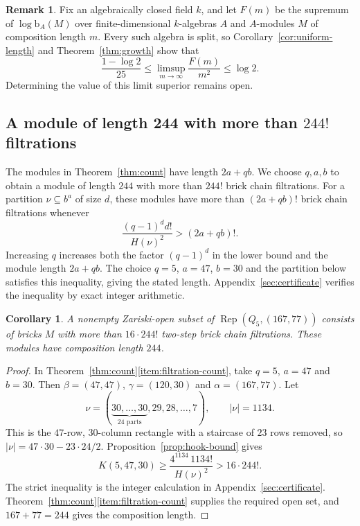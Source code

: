 \documentclass[a4paper,reqno,10pt]{amsart}
\newtheorem{corollary}[theorem]{Corollary}
\theoremstyle{definition}
\newtheorem{remark}[theorem]{Remark}
\numberwithin{equation}{section}
\newcommand{\Rep}{\operatorname{Rep}}
\newcommand{\bcount}{\mathrm b}
\begin{document}
\begin{remark}
Fix an algebraically closed field $k$, and let $F(m)$ be the supremum
of $\log\bcount_A(M)$ over finite-dimensional $k$-algebras $A$ and
$A$-modules $M$ of composition length $m$. Every such algebra is split,
so Corollary~\ref{cor:uniform-length} and Theorem~\ref{thm:growth} show
that
\[
 \frac{1-\log2}{25}
 \leq \limsup_{m\to\infty}\frac{F(m)}{m^2}
 \leq \log2.
\]
Determining the value of this limit superior remains open.
\end{remark}

\subsection{A module of length 244 with more than \texorpdfstring{$244!$}{244!} filtrations}

The modules in Theorem~\ref{thm:count} have length $2a+qb$.
We choose $q,a,b$ to obtain a module of length $244$ with more than
$244!$ brick chain filtrations.
For a partition $\nu\subseteq b^a$ of size $d$, these modules have
more than $(2a+qb)!$ brick chain filtrations whenever
\[
 \frac{(q-1)^d d!}{H(\nu)^2}>(2a+qb)!.
\]
Increasing $q$ increases both the factor $(q-1)^d$ in the lower bound
and the module length $2a+qb$. The choice $q=5$, $a=47$, $b=30$
and the partition below satisfies this inequality, giving the stated
length. Appendix~\ref{sec:certificate} verifies the inequality by
exact integer arithmetic.
\begin{corollary}\label{cor:244}
A nonempty Zariski-open subset of $\Rep(Q_5,(167,77))$ consists of
bricks $M$ with more than $16\cdot244!$ two-step brick chain
filtrations. These modules have composition length $244$.
\end{corollary}

\begin{proof}
In Theorem~\ref{thm:count}\ref{item:filtration-count}, take $q=5$, $a=47$ and $b=30$.
Then $\beta=(47,47)$, $\gamma=(120,30)$ and $\alpha=(167,77)$.
Let
\[
 \nu=(\underbrace{30,\ldots,30}_{24\text{ parts}},29,28,\ldots,7),
 \qquad |\nu|=1134.
\]
This is the $47$-row, $30$-column rectangle with a staircase of
$23$ rows removed, so $|\nu|=47\cdot30-23\cdot24/2$.
Proposition~\ref{prop:hook-bound} gives
\[
 K(5,47,30)\geq\frac{4^{1134}\,1134!}{H(\nu)^2}
                   >16\cdot244!.
\]
The strict inequality is the integer calculation in
Appendix~\ref{sec:certificate}. Theorem~\ref{thm:count}\ref{item:filtration-count} supplies the
required open set, and $167+77=244$ gives the composition length.
\end{proof}
\end{document}
